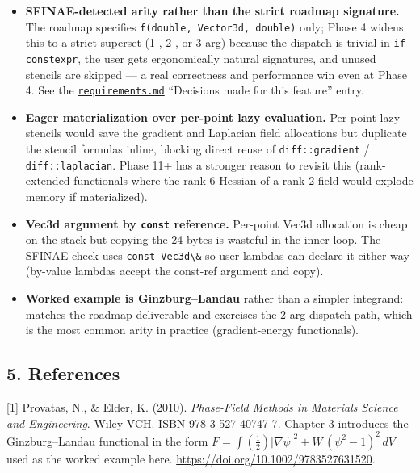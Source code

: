 \begin{itemize}
\tightlist
\item
  \textbf{SFINAE-detected arity rather than the strict roadmap
  signature.} The roadmap specifies
  \passthrough{\lstinline!f(double, Vector3d, double)!} only; Phase 4
  widens this to a strict superset (1-, 2-, or 3-arg) because the
  dispatch is trivial in \passthrough{\lstinline!if constexpr!}, the
  user gets ergonomically natural signatures, and unused stencils are
  skipped --- a real correctness and performance win even at Phase 4.
  See the
  \href{../../../specs/2026-05-02-phase-4-functional-evaluation/requirements.md}{\passthrough{\lstinline!requirements.md!}}
  ``Decisions made for this feature'' entry.
\item
  \textbf{Eager materialization over per-point lazy evaluation.}
  Per-point lazy stencils would save the gradient and Laplacian field
  allocations but duplicate the stencil formulas inline, blocking direct
  reuse of \passthrough{\lstinline!diff::gradient!} /
  \passthrough{\lstinline!diff::laplacian!}. Phase 11+ has a stronger
  reason to revisit this (rank-extended functionals where the rank-6
  Hessian of a rank-2 field would explode memory if materialized).
\item
  \textbf{Vec3d argument by \passthrough{\lstinline!const!} reference.}
  Per-point Vec3d allocation is cheap on the stack but copying the 24
  bytes is wasteful in the inner loop. The SFINAE check uses
  \passthrough{\lstinline!const Vec3d\&!} so user lambdas can declare it
  either way (by-value lambdas accept the const-ref argument and copy).
\item
  \textbf{Worked example is Ginzburg--Landau} rather than a simpler
  integrand: matches the roadmap deliverable and exercises the 2-arg
  dispatch path, which is the most common arity in practice
  (gradient-energy functionals).
\end{itemize}

\subsection{5. References}\label{references}

{[}1{]} Provatas, N., \& Elder, K. (2010). \emph{Phase-Field Methods in
Materials Science and Engineering}. Wiley-VCH. ISBN 978-3-527-40747-7.
Chapter 3 introduces the Ginzburg--Landau functional in the form
\(F = \int (\tfrac{1}{2})|\nabla\psi|^2 + W\,(\psi^2-1)^2\, dV\) used as
the worked example here. \url{https://doi.org/10.1002/9783527631520}.


